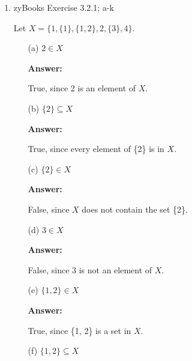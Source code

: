 \documentclass[14pt]{extreport}
\newcommand{\answer}[0]{\medskip \textbf{Answer:} \medskip}
\begin{document}
\begin{enumerate}
\begin{enumerate}
            \item[(d)] \( \{ 0, 10, 20, 30, \dots 1000 \} \)
            
                \answer

                This is the set of non-negative integer multiples of 10, up to 1000.

                So \( A = \left\{ x \in \mathbb{Z}, (0 \leq x \leq 1000) \land (x \mod 10 = 0) \right\} \), and \( |A| = 101 \).

        \end{enumerate}

    \item zyBooks Exercise 3.2.1; a-k
    
    Let \( X = \{ 1, \{1\}, \{1, 2\}, 2, \{3\}, 4 \} \).
    
        \begin{enumerate}
            
            \item[(a)] \( 2 \in X \)
            
                \answer

                True, since 2 is an element of \( X \).

            \item[(b)] \( \{2\} \subseteq X \)
            
                \answer

                True, since every element of \{2\} is in \( X \).

            \item[(c)] \( \{2\} \in X \)
            
                \answer

                False, since \( X \) does not contain the set \{2\}.

            \item[(d)] \( 3 \in X \)
            
                \answer

                False, since 3 is not an element of \( X \).

            \item[(e)] \( \{1, 2\} \in X \)
            
                \answer

                True, since \{1, 2\} is a set in \( X \).

            \item[(f)] \( \{1, 2\} \subseteq X \)
            

\end{enumerate}
\end{enumerate}
\end{document}

